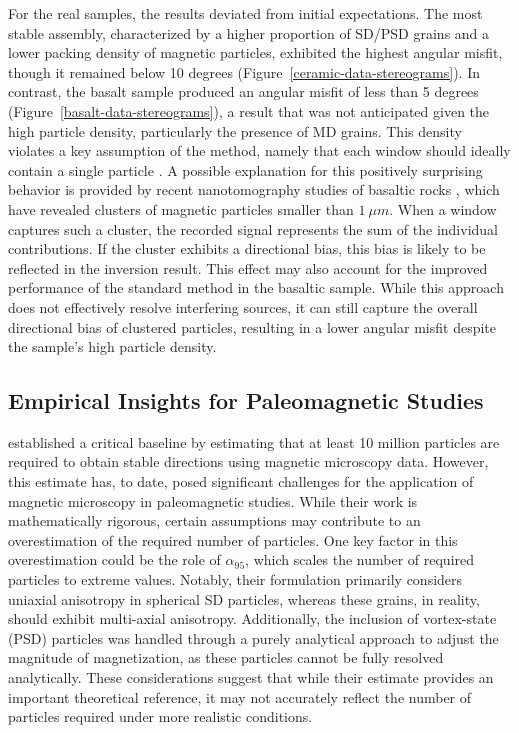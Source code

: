 For the real samples, the results deviated from initial expectations. The most stable assembly, characterized by a higher proportion of SD/PSD grains and a lower packing density of magnetic particles, exhibited the highest angular misfit, though it remained below 10 degrees (Figure~\ref{ceramic-data-stereograms}). In contrast, the basalt sample produced an angular misfit of less than 5 degrees (Figure~\ref{basalt-data-stereograms}), a result that was not anticipated given the high particle density, particularly the presence of MD grains. This density violates a key assumption of the method, namely that each window should ideally contain a single particle \citep{Souza-Junior2024}. A possible explanation for this positively surprising behavior is provided by recent nanotomography studies of basaltic rocks \citep[\textit{e.g.}][]{Out2024, Out2025}, which have revealed clusters of magnetic particles smaller than \(1~\mu m\). When a window captures such a cluster, the recorded signal represents the sum of the individual contributions. If the cluster exhibits a directional bias, this bias is likely to be reflected in the inversion result. This effect may also account for the improved performance of the standard method in the basaltic sample. While this approach does not effectively resolve interfering sources, it can still capture the overall directional bias of clustered particles, resulting in a lower angular misfit despite the sample’s high particle density.


\subsection{Empirical Insights for Paleomagnetic Studies}

\citet{Berndt2016} established a critical baseline by estimating that at least 10 million particles are required to obtain stable directions using magnetic microscopy data. However, this estimate has, to date, posed significant challenges for the application of magnetic microscopy in paleomagnetic studies. While their work is mathematically rigorous, certain assumptions may contribute to an overestimation of the required number of particles. One key factor in this overestimation could be the role of \textit{$\alpha_{95}$}, which scales the number of required particles to extreme values. Notably, their formulation primarily considers uniaxial anisotropy in spherical SD particles, whereas these grains, in reality, should exhibit multi-axial anisotropy. Additionally, the inclusion of vortex-state (PSD) particles was handled through a purely analytical approach to adjust the magnitude of magnetization, as these particles cannot be fully resolved analytically. These considerations suggest that while their estimate provides an important theoretical reference, it may not accurately reflect the number of particles required under more realistic conditions.

